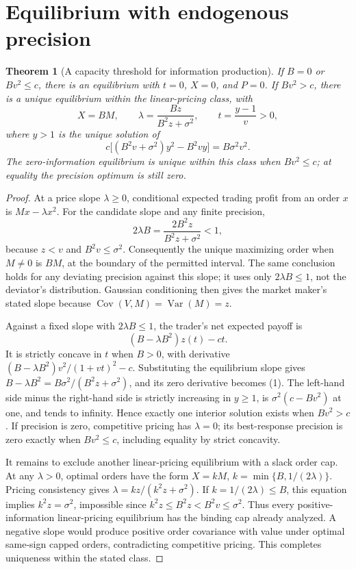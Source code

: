 \documentclass[11pt,a4paper]{article}
\newtheorem{theorem}{Theorem}[section]
\theoremstyle{remark}
\DeclareMathOperator{\Var}{Var}
\begin{document}
\section{Equilibrium with endogenous precision}
\begin{theorem}[A capacity threshold for information production]
If $B=0$ or $Bv^2\le c$, there is an equilibrium with $t=0$, $X=0$, and $P=0$. If $Bv^2>c$, there is a unique equilibrium within the linear-pricing class, with
\[
 X=BM,\qquad \lambda=\frac{Bz}{B^2z+\sigma^2},\qquad
 t=\frac{y-1}{v}>0,
\]
where $y>1$ is the unique solution of
\[
 c\big[(B^2v+\sigma^2)y^2-B^2vy\big]=B\sigma^2v^2. \tag{1}
\]
The zero-information equilibrium is unique within this class when $Bv^2\le c$; at equality the precision optimum is still zero.
\end{theorem}
\begin{proof}
At a price slope $\lambda\ge0$, conditional expected trading profit from an order $x$ is $Mx-\lambda x^2$. For the candidate slope and any finite precision,
\[
 2\lambda B=\frac{2B^2z}{B^2z+\sigma^2}<1,
\]
because $z<v$ and $B^2v\le\sigma^2$. Consequently the unique maximizing order when $M\ne0$ is $BM$, at the boundary of the permitted interval. The same conclusion holds for any deviating precision against this slope; it uses only $2\lambda B\le1$, not the deviator's distribution. Gaussian conditioning then gives the market maker's stated slope because $\operatorname{Cov}(V,M)=\Var(M)=z$.

Against a fixed slope with $2\lambda B\le1$, the trader's net expected payoff is
\[
 (B-\lambda B^2)z(t)-ct.
\]
It is strictly concave in $t$ when $B>0$, with derivative $(B-\lambda B^2)v^2/(1+vt)^2-c$. Substituting the equilibrium slope gives $B-\lambda B^2=B\sigma^2/(B^2z+\sigma^2)$, and its zero derivative becomes (1). The left-hand side minus the right-hand side is strictly increasing in $y\ge1$, is $\sigma^2(c-Bv^2)$ at one, and tends to infinity. Hence exactly one interior solution exists when $Bv^2>c$. If precision is zero, competitive pricing has $\lambda=0$; its best-response precision is zero exactly when $Bv^2\le c$, including equality by strict concavity.

It remains to exclude another linear-pricing equilibrium with a slack order cap. At any $\lambda>0$, optimal orders have the form $X=kM$, $k=\min\{B,1/(2\lambda)\}$. Pricing consistency gives $\lambda=kz/(k^2z+\sigma^2)$. If $k=1/(2\lambda)\le B$, this equation implies $k^2z=\sigma^2$, impossible since $k^2z\le B^2z<B^2v\le\sigma^2$. Thus every positive-information linear-pricing equilibrium has the binding cap already analyzed. A negative slope would produce positive order covariance with value under optimal same-sign capped orders, contradicting competitive pricing. This completes uniqueness within the stated class.
\end{proof}
\end{document}
